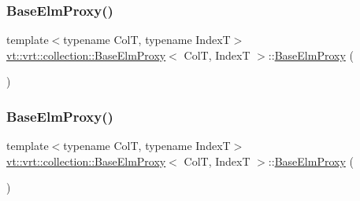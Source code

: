 \subsubsection{\texorpdfstring{Base\+Elm\+Proxy()}{BaseElmProxy()}\hspace{0.1cm}{\footnotesize\ttfamily [3/5]}}
{\footnotesize\ttfamily template$<$typename ColT, typename IndexT$>$ \\
\hyperlink{structvt_1_1vrt_1_1collection_1_1_base_elm_proxy}{vt\+::vrt\+::collection\+::\+Base\+Elm\+Proxy}$<$ ColT, IndexT $>$\+::\hyperlink{structvt_1_1vrt_1_1collection_1_1_base_elm_proxy}{Base\+Elm\+Proxy} (\begin{DoxyParamCaption}{ }\end{DoxyParamCaption})\hspace{0.3cm}{\ttfamily [default]}}

\mbox{\label{structvt_1_1vrt_1_1collection_1_1_base_elm_proxy_a85d73db08cdb024b53641ad9d815997a}} 
\subsubsection{\texorpdfstring{Base\+Elm\+Proxy()}{BaseElmProxy()}\hspace{0.1cm}{\footnotesize\ttfamily [4/5]}}
{\footnotesize\ttfamily template$<$typename ColT, typename IndexT$>$ \\
\hyperlink{structvt_1_1vrt_1_1collection_1_1_base_elm_proxy}{vt\+::vrt\+::collection\+::\+Base\+Elm\+Proxy}$<$ ColT, IndexT $>$\+::\hyperlink{structvt_1_1vrt_1_1collection_1_1_base_elm_proxy}{Base\+Elm\+Proxy} (\begin{DoxyParamCaption}\item[{\hyperlink{structvt_1_1vrt_1_1collection_1_1_base_elm_proxy}{Base\+Elm\+Proxy}$<$ ColT, IndexT $>$ const \&}]{ }\end{DoxyParamCaption})\hspace{0.3cm}{\ttfamily [default]}}

\mbox{\label{structvt_1_1vrt_1_1collection_1_1_base_elm_proxy_a35fe7ab51f205eeb6a58716472461972}} 

